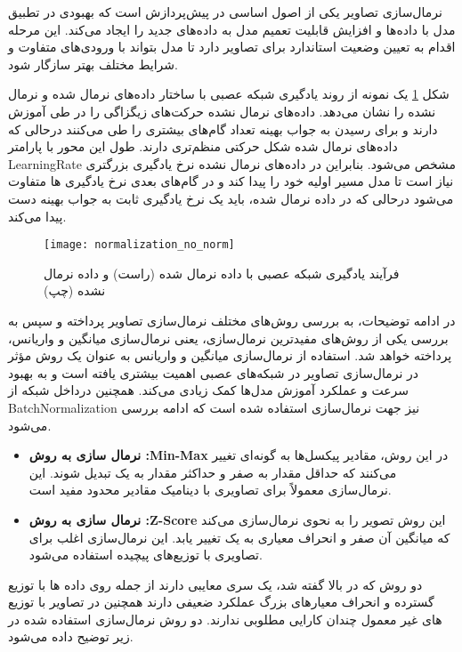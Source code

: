 نرمال‌سازی تصاویر یکی از اصول اساسی در پیش‌پردازش است که بهبودی در تطبیق مدل با داده‌ها و افزایش قابلیت تعمیم مدل به داده‌های جدید را ایجاد می‌کند. این مرحله اقدام به تعیین وضعیت استاندارد برای تصاویر دارد تا مدل بتواند با ورودی‌های متفاوت و شرایط مختلف بهتر سازگار شود.

شکل %
\ref{fig:normalization_no_norm}
یک نمونه از روند یادگیری شبکه عصبی با ساختار داده‌های نرمال‌ شده و نرمال نشده را نشان می‌دهد. داده‌های نرمال نشده حرکت‌های زیگزاگی را در طی آموزش دارند و برای رسیدن به جواب بهینه تعداد گام‌های بیشتری را طی می‌کنند درحالی که داده‌های نرمال شده شکل حرکتی منظم‌تری دارند. طول این محور با پارامتر %
\gls{LearningRate}
مشخص می‌شود. بنابراین در داده‌های نرمال نشده نرخ یادگیری بزرگتری نیاز است تا مدل مسیر اولیه خود را پیدا کند و در گام‌های بعدی نرخ یادگیری ها متفاوت می‌شود درحالی که در داده نرمال شده،‌ باید یک نرخ یادگیری ثابت به جواب بهینه دست پیدا می‌کند.

\begin{figure}[ht]
	\centerline{\texttt{[image: normalization\_no\_norm]}}
	\caption{فرآیند یادگیری شبکه عصبی با داده نرمال شده (راست) و داده نرمال نشده (چپ)
	 \cite{Normal_not_Normal}
	}
	\label{fig:normalization_no_norm}
\end{figure}

در ادامه توضیحات، به بررسی روش‌های مختلف نرمال‌سازی تصاویر پرداخته و سپس به بررسی یکی از روش‌های مفید‌ترین نرمال‌سازی، یعنی  نرمال‌سازی میانگین و واریانس، پرداخته خواهد شد. استفاده از  نرمال‌سازی میانگین و واریانس به عنوان یک روش مؤثر در نرمال‌سازی تصاویر در شبکه‌های عصبی اهمیت بیشتری یافته است و به بهبود سرعت و عملکرد آموزش مدل‌ها کمک زیادی می‌کند. همچنین درداخل شبکه از %
\gls{BatchNormalization}
 نیز جهت نرمال‌سازی استفاده شده است که ادامه بررسی می‌شود.
\begin{itemize}
	\item \textbf{نرمال سازی به روش :Min-Max }
	در این روش، مقادیر پیکسل‌ها به گونه‌ای تغییر می‌کنند که حداقل مقدار به صفر و حداکثر مقدار به یک تبدیل شوند. این نرمال‌سازی معمولاً برای تصاویری با دینامیک مقادیر محدود مفید است.
	\item \textbf{نرمال سازی به روش :Z-Score }
	 این روش تصویر را به نحوی نرمال‌سازی می‌کند که میانگین آن صفر و انحراف معیاری به یک تغییر یابد. این نرمال‌سازی اغلب برای تصاویری با توزیع‌های پیچیده استفاده می‌شود.
\end{itemize}
دو روش که در بالا گفته شد، یک سری معایبی دارند از جمله روی داده ها با توزیع گسترده و انحراف معیار‌های بزرگ عملکرد ضعیفی دارند همچنین در تصاویر با توزیع های غیر معمول چندان کارایی مطلوبی ندارند. دو روش نرمال‌سازی استفاده شده در زیر توضیح داده می‌شود.

